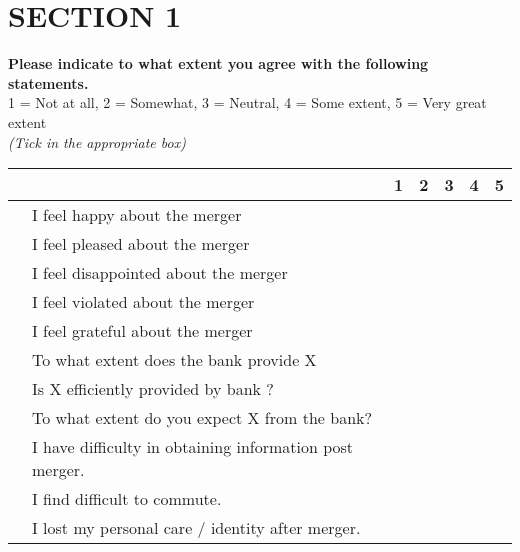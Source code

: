 \documentclass[10pt,a4paper]{article}
\newcounter{magicrownumbers}
\newcommand\rownumber{\stepcounter{magicrownumbers}\arabic{magicrownumbers}}
\newcommand \tab[1][1cm]{\hspace*{#1}}
\begin{document}
{\selectfont
\section*{SECTION 1}
\textbf{Please indicate to what extent you agree with the following statements.} \\
1 = Not at all, 2 = Somewhat, 3 = Neutral, 4 = Some extent, 5 = Very great extent\\
\emph {(Tick in the appropriate box)}\\
\begin{minipage}{\textwidth}

\begin{tabular}{|c|l|c|c|c|c|c|}
\hline \multicolumn{2}{|c|}{} & 1 & 2 & 3 & 4 & 5\\
\hline \rownumber & I feel happy about the merger & \tab & \tab & \tab & \tab & \tab \\
\hline \rownumber & I feel pleased about the merger & \tab & \tab & \tab & \tab & \tab \\
\hline \rownumber & I feel disappointed about the merger & \tab & \tab & \tab & \tab & \tab \\
\hline \rownumber & I feel violated about the merger & \tab & \tab & \tab & \tab & \tab \\
\hline \rownumber & I feel grateful about the merger & \tab & \tab & \tab & \tab & \tab \\
\hline \rownumber & To what extent does the bank provide X  & \tab & \tab & \tab & \tab & \tab \\
\hline \rownumber & Is X efficiently provided by bank ? & \tab & \tab & \tab & \tab & \tab \\
\hline \rownumber & To what extent do you expect X from the bank? & \tab & \tab & \tab & \tab & \tab \\
\hline \rownumber & I have difficulty in obtaining information post merger. & \tab & \tab & \tab & \tab & \tab \\
\hline \rownumber & I find difficult to commute. & \tab & \tab & \tab & \tab & \tab \\
\hline \rownumber & I lost my personal care / identity after merger. & \tab & \tab & \tab & \tab & \tab \\
\hline
\end{tabular}


\end{minipage}}
\end{document}
